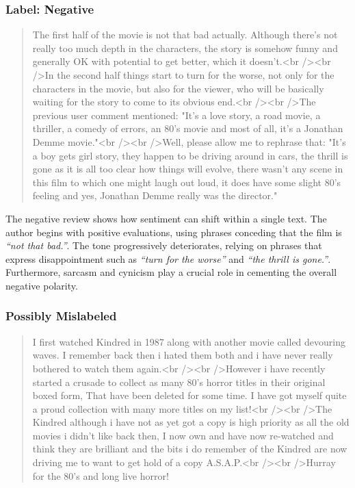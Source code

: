 \documentclass[a4paper,twoside,12pt]{book}
\newcommand{\literal}[1]{\textit{``#1''}}
\begin{document}
\subsubsection{Label: Negative}

\begin{quote}	
	The first half of the movie is not that bad actually. Although there's not really too much depth in the characters, the story is somehow funny and generally OK with potential to get better, which it doesn't.<br /><br />In the second half things start to turn for the worse, not only for the characters in the movie, but also for the viewer, who will be basically waiting for the story to come to its obvious end.<br /><br />The previous user comment mentioned: "It's a love story, a road movie, a thriller, a comedy of errors, an 80's movie and most of all, it's a Jonathan Demme movie."<br /><br />Well, please allow me to rephrase that: "It's a boy gets girl story, they happen to be driving around in cars, the thrill is gone as it is all too clear how things will evolve, there wasn't any scene in this film to which one might laugh out loud, it does have some slight 80's feeling and yes, Jonathan Demme really was the director."
\end{quote}

The negative review shows how sentiment can shift within a single text. The author begins with positive evaluations, using phrases conceding that the film is \literal{not that bad.}. The tone progressively deteriorates, relying on phrases that express disappointment such as \literal{turn for the worse} and \literal{the thrill is gone.}. Furthermore, sarcasm and cynicism play a crucial role in cementing the overall negative polarity.

\subsubsection{Possibly Mislabeled}

\begin{quote}
	I first watched Kindred in 1987 along with another movie called devouring waves. I remember back then i hated them both and i have never really bothered to watch them again.<br /><br />However i have recently started a crusade to collect as many 80's horror titles in their original boxed form, That have been deleted for some time. I have got myself quite a proud collection with many more titles on my list!<br /><br />The Kindred although i have not as yet got a copy is high priority as all the old movies i didn't like back then, I now own and have now re-watched and think they are brilliant and the bits i do remember of the Kindred are now driving me to want to get hold of a copy A.S.A.P.<br /><br />Hurray for the 80's and long live horror!
\end{quote}
\end{document}
